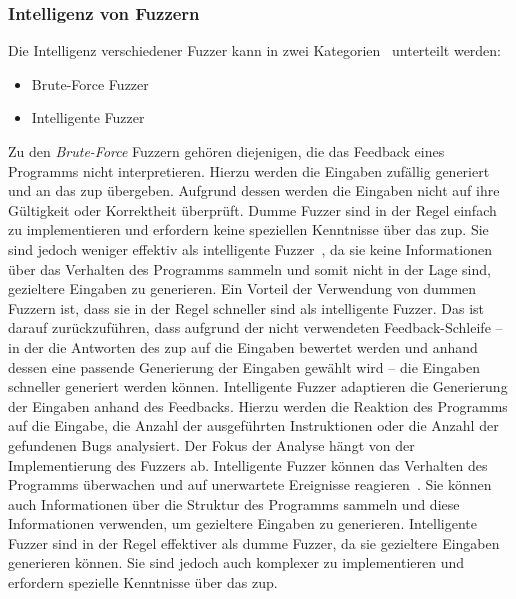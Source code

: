 
\subsubsection{Intelligenz von Fuzzern}\label{subsubsec:intelligenz-von-fuzzern}
Die Intelligenz verschiedener Fuzzer kann in zwei Kategorien~\cite{fuzzer-intelligence} unterteilt werden:
\begin{itemize}
    \item Brute-Force Fuzzer
    \item Intelligente Fuzzer
\end{itemize}
Zu den \textit{Brute-Force} Fuzzern gehören diejenigen, die das Feedback eines Programms nicht interpretieren.
Hierzu werden die Eingaben zufällig generiert und an das \gls{zup} übergeben.
Aufgrund dessen werden die Eingaben nicht auf ihre Gültigkeit oder Korrektheit überprüft.
Dumme Fuzzer sind in der Regel einfach zu implementieren und erfordern keine speziellen Kenntnisse über das \gls{zup}.
Sie sind jedoch weniger effektiv als intelligente Fuzzer~\cite{fuzzer-intelligence}, da sie keine Informationen über das Verhalten des Programms
sammeln und somit nicht in der Lage sind, gezieltere Eingaben zu generieren.
Ein Vorteil der Verwendung von dummen Fuzzern ist, dass sie in der Regel schneller sind als intelligente Fuzzer.
Das ist darauf zurückzuführen, dass aufgrund der nicht verwendeten Feedback-Schleife -- in der die Antworten des \gls{zup}
auf die Eingaben bewertet werden und anhand dessen eine passende Generierung der Eingaben gewählt wird --
die Eingaben schneller generiert werden können.\newline\newline
\noindent Intelligente Fuzzer adaptieren die Generierung der Eingaben anhand des Feedbacks.
Hierzu werden die Reaktion des Programms auf die Eingabe, die Anzahl der ausgeführten Instruktionen
oder die Anzahl der gefundenen Bugs analysiert.
Der Fokus der Analyse hängt von der Implementierung des Fuzzers ab.
Intelligente Fuzzer können das Verhalten des Programms überwachen und auf unerwartete Ereignisse reagieren~\cite{smart-fuzzing}.
Sie können auch Informationen über die Struktur des Programms sammeln und diese Informationen verwenden, um gezieltere Eingaben zu generieren.\newline
Intelligente Fuzzer sind in der Regel effektiver als dumme Fuzzer, da sie gezieltere Eingaben generieren können.
Sie sind jedoch auch komplexer zu implementieren und erfordern spezielle Kenntnisse über das \gls{zup}.
